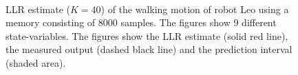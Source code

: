 \begin{figure}[htbp]
{\label{fig:LLR-LeoFullMemStep_17}
} \\
\caption[\ac{LLR} estimate of Leo walking, state-variables 10-18]{\ac{LLR} estimate ($K=40$) of the walking motion of robot Leo using a memory consisting of 8000 samples. The figures show 9 different state-variables. The figures show the \ac{LLR} estimate (solid red line), the measured output (dashed black line) and the prediction interval (shaded area).}
\label{fig:LLR-LeoFullMemStep_all_b}
\end{figure}